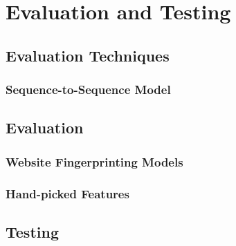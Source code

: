 \section{Evaluation and Testing}

\subsection{Evaluation Techniques}

\subsubsection{Sequence-to-Sequence Model}

\subsection{Evaluation}


\subsubsection{Website Fingerprinting Models}


\subsubsection{Hand-picked Features}



\subsection{Testing}

